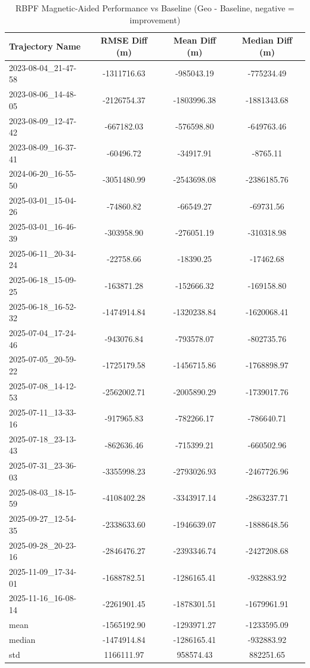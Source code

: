 \begin{table}[h]
    \centering
    \caption{RBPF Magnetic-Aided Performance vs Baseline (Geo - Baseline, negative = improvement)}
    \begin{tabular}{ || l  ||ccc|| }
    \toprule
   Trajectory Name & RMSE Diff (m) & Mean Diff (m) & Median Diff (m) \\
        \midrule
        2023-08-04\_21-47-58 & -1311716.63 & -985043.19 & -775234.49 \\
        2023-08-06\_14-48-05 & -2126754.37 & -1803996.38 & -1881343.68 \\
        2023-08-09\_12-47-42 & -667182.03 & -576598.80 & -649763.46 \\
        2023-08-09\_16-37-41 & -60496.72 & -34917.91 & -8765.11 \\
        2024-06-20\_16-55-50 & -3051480.99 & -2543698.08 & -2386185.76 \\
        2025-03-01\_15-04-26 & -74860.82 & -66549.27 & -69731.56 \\
        2025-03-01\_16-46-39 & -303958.90 & -276051.19 & -310318.98 \\
        2025-06-11\_20-34-24 & -22758.66 & -18390.25 & -17462.68 \\
        2025-06-18\_15-09-25 & -163871.28 & -152666.32 & -169158.80 \\
        2025-06-18\_16-52-32 & -1474914.84 & -1320238.84 & -1620068.41 \\
        2025-07-04\_17-24-46 & -943076.84 & -793578.07 & -802735.76 \\
        2025-07-05\_20-59-22 & -1725179.58 & -1456715.86 & -1768898.97 \\
        2025-07-08\_14-12-53 & -2562002.71 & -2005890.29 & -1739017.76 \\
        2025-07-11\_13-33-16 & -917965.83 & -782266.17 & -786640.71 \\
        2025-07-18\_23-13-43 & -862636.46 & -715399.21 & -660502.96 \\
        2025-07-31\_23-36-03 & -3355998.23 & -2793026.93 & -2467726.96 \\
        2025-08-03\_18-15-59 & -4108402.28 & -3343917.14 & -2863237.71 \\
        2025-09-27\_12-54-35 & -2338633.60 & -1946639.07 & -1888648.56 \\
        2025-09-28\_20-23-16 & -2846476.27 & -2393346.74 & -2427208.68 \\
        2025-11-09\_17-34-01 & -1688782.51 & -1286165.41 & -932883.92 \\
        2025-11-16\_16-08-14 & -2261901.45 & -1878301.51 & -1679961.91 \\
        \midrule
        mean & -1565192.90 & -1293971.27 & -1233595.09 \\
        median & -1474914.84 & -1286165.41 & -932883.92 \\
        std & 1166111.97 & 958574.43 & 882251.65 \\
        \bottomrule
    \end{tabular}
    \label{tab:rbpf_results}
\end{table}